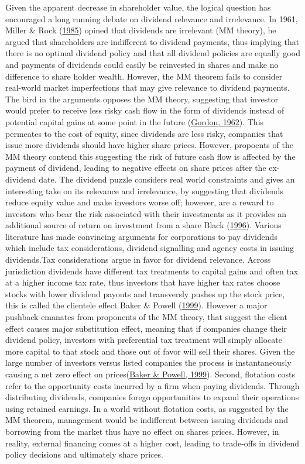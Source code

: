 \documentclass[11pt,preprint, authoryear]{elsarticle}
\numberwithin{equation}{section}
\numberwithin{figure}{section}
\numberwithin{table}{section}
\begin{document}
Given the apparent decrease in shareholder value, the logical question
has encouraged a long running debate on dividend relevance and
irrelevance. In 1961, Miller \& Rock
(\protect\hyperlink{ref-miller1985dividend}{1985}) opined that dividends
are irrelevant (MM theory), he argued that shareholders are indifferent
to dividend payments, thus implying that there is no optimal dividend
policy and that all dividend policies are equally good and payments of
dividends could easily be reinvested in shares and make no difference to
share holder wealth. However, the MM theorem fails to consider
real-world market imperfections that may give relevance to dividend
payments. The bird in the arguments opposes the MM theory, suggesting
that investor would prefer to receive less risky cash flow in the form
of dividends instead of potential capital gains at some point in the
future (\protect\hyperlink{ref-gordon1962}{Gordon, 1962}). This
permeates to the cost of equity, since dividends are less risky,
companies that issue more dividends should have higher share prices.
However, propoents of the MM theory contend this suggesting the risk of
future cash flow is affected by the payment of dividend, leading to
negative effects on share prices after the ex-dividend date. The
dividend puzzle considers real world constraints and gives an
interesting take on its relevance and irrelevance, by suggesting that
dividends reduce equity value and make investors worse off; however, are
a reward to investors who bear the risk associated with their
investments as it provides an additional source of return on investment
from a share Black (\protect\hyperlink{ref-black1996dividend}{1996}).
Various literature has made convincing arguments for corporations to pay
dividends which include tax considerations, dividend signalling and
agency costs in issuing dividends.Tax considerations argue in favor for
dividend relevance. Across jurisdiction dividends have different tax
treatments to capital gains and often tax at a higher income tax rate,
thus investors that have higher tax rates choose stocks with lower
dividend payouts and transversly pushes up the stock price, this is
called the clientele effect Baker \& Powell
(\protect\hyperlink{ref-baker1999corporate}{1999}). However a major
pushback emanates from proponents of the MM theory, that suggest the
client effect causes major substitution effect, meaning that if
companies change their dividend policy, investors with preferential tax
treatment will simply allocate more capital to that stock and those out
of favor will sell their shares. Given the large number of investors
versus listed companies the process is instantaneously causing a net
zero effect on prices(\protect\hyperlink{ref-baker1999corporate}{Baker
\& Powell, 1999}). Second, flotation costs refer to the opportunity
costs incurred by a firm when paying dividends. Through distributing
dividends, companies forego opportunities to expand their operations
using retained earnings. In a world without flotation costs, as
suggested by the MM theorem, management would be indifferent between
issuing dividends and borrowing from the market thus have no effect on
shares prices. However, in reality, external financing comes at a higher
cost, leading to trade-offs in dividend policy decisions and ultimately
share prices.
\end{document}

